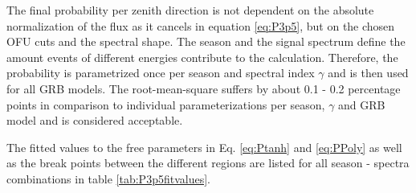 The final probability per zenith direction is not dependent on the absolute 
normalization of the flux as it cancels in equation \ref{eq:P3p5}, but on the 
chosen OFU cuts and the spectral shape. The season and the signal spectrum
define the amount 
events of different energies contribute to the calculation. Therefore, the 
probability is parametrized once per season and spectral index $\gamma$ and is 
then used for all GRB models. The root-mean-square suffers by about 0.1 - 0.2 
percentage points in comparison to individual parameterizations per season, 
$\gamma$ and GRB model and is considered acceptable.

The fitted values to the free parameters in Eq. \ref{eq:Ptanh} and 
\ref{eq:PPoly} as well as the break points between the different regions are 
listed for all season - spectra combinations in table \ref{tab:P3p5fitvalues}.

